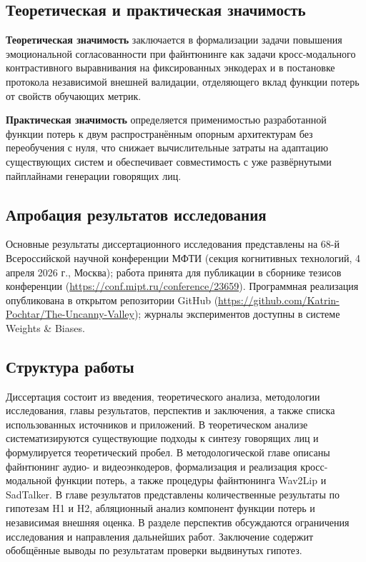 \documentclass[a4paper, 12pt, oneside, openany]{article}
\begin{document}
\subsection{Теоретическая и практическая значимость}

\textbf{Теоретическая значимость} заключается в формализации задачи повышения эмоциональной согласованности при файнтюнинге как задачи кросс-модального контрастивного выравнивания на фиксированных энкодерах и в постановке протокола независимой внешней валидации, отделяющего вклад функции потерь от свойств обучающих метрик.

\textbf{Практическая значимость} определяется применимостью разработанной функции потерь к двум распространённым опорным архитектурам без переобучения с нуля, что снижает вычислительные затраты на адаптацию существующих систем и обеспечивает совместимость с уже развёрнутыми пайплайнами генерации говорящих лиц.

\subsection{Апробация результатов исследования}

Основные результаты диссертационного исследования представлены на 68-й Всероссийской научной конференции МФТИ (секция когнитивных технологий, 4 апреля 2026 г., Москва); работа принята для публикации в сборнике тезисов конференции (\url{https://conf.mipt.ru/conference/23659}). Программная реализация опубликована в открытом репозитории GitHub (\url{https://github.com/Katrin-Pochtar/The-Uncanny-Valley}); журналы экспериментов доступны в системе Weights \& Biases.

\subsection{Структура работы}

Диссертация состоит из введения, теоретического анализа, методологии исследования, главы результатов, перспектив и заключения, а также списка использованных источников и приложений. В теоретическом анализе систематизируются существующие подходы к синтезу говорящих лиц и формулируется теоретический пробел. В методологической главе описаны файнтюнинг аудио- и видеоэнкодеров, формализация и реализация кросс-модальной функции потерь, а также процедуры файнтюнинга Wav2Lip и SadTalker. В главе результатов представлены количественные результаты по гипотезам H1 и H2, абляционный анализ компонент функции потерь и независимая внешняя оценка. В разделе перспектив обсуждаются ограничения исследования и направления дальнейших работ. Заключение содержит обобщённые выводы по результатам проверки выдвинутых гипотез.
\end{document}
